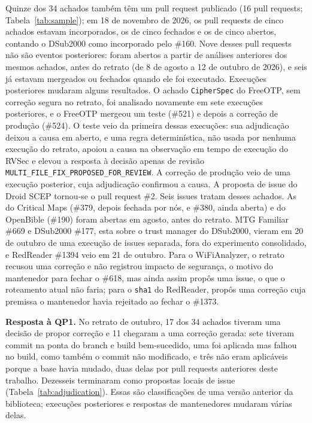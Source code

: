 \documentclass[conference]{IEEEtran}
\newcommand{\researchq}[1]{\textbf{QP#1}}
\begin{document}
Quinze dos 34 achados também têm um pull request publicado (16 pull requests;
Tabela~\ref{tab:sample}); em 18 de novembro de 2026, os pull requests de cinco
achados estavam incorporados, os de cinco fechados e os de cinco abertos,
contando o DSub2000 como incorporado pelo \#160. Nove desses pull requests não
são eventos posteriores: foram abertos a partir de análises anteriores dos
mesmos achados, antes do retrato (de 8 de agosto a 12 de outubro de 2026), e
seis já estavam mergeados ou fechados quando ele foi executado. Execuções
posteriores mudaram alguns resultados. O achado \texttt{CipherSpec} do FreeOTP,
sem correção segura no retrato, foi analisado novamente em sete execuções
posteriores, e o FreeOTP mergeou um teste (\#521) e depois a correção de
produção (\#524). O teste veio da primeira dessas execuções: sua
adjudicação deixou a causa em aberto, e uma regra determinística, não usada por
nenhuma execução do retrato, apoiou a causa na observação em tempo de execução
do RVSec e elevou a resposta à decisão apenas de revisão
\texttt{MULTI\_FILE\_FIX\_}\allowbreak\texttt{PROPOSED\_FOR\_REVIEW}. A correção
de produção veio de uma execução posterior, cuja adjudicação confirmou a causa. A proposta de issue do Droid SCEP tornou-se o pull request \#2. Seis issues
tratam desses achados. As do Critical Maps (\#379, depois fechada por nós, e
\#380, ainda aberta) e do OpenBible (\#190) foram abertas em agosto, antes do
retrato. MTG Familiar \#669 e DSub2000 \#177, esta sobre o trust manager do
DSub2000, vieram em 20 de outubro de uma execução de issues separada, fora do
experimento consolidado, e RedReader \#1394 veio em 21 de outubro.
Para o WiFiAnalyzer, o retrato recusou uma correção e não registrou impacto de segurança,
o motivo do mantenedor para fechar o \#618, mas ainda assim propôs uma issue, o que
o roteamento atual não faria; para o \texttt{sha1} do RedReader, propôs uma correção
cuja premissa o mantenedor havia rejeitado ao fechar o \#1373.

\textbf{Resposta à \researchq{1}.} No retrato de outubro, 17 dos 34 achados
tiveram uma decisão de propor correção e 11 chegaram a uma correção gerada: sete
tiveram commit na ponta do branch e build bem-sucedido, uma foi aplicada mas
falhou no build, como também o commit não modificado, e três não eram aplicáveis
porque a base havia mudado, duas delas por pull requests anteriores deste
trabalho. Dezesseis terminaram como propostas locais de issue
(Tabela~\ref{tab:adjudication}). Essas são classificações de uma versão anterior da biblioteca;
execuções posteriores e respostas de mantenedores mudaram várias delas.
\end{document}
